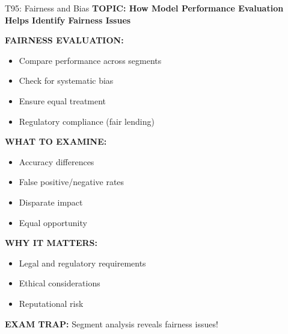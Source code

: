\documentclass[8pt]{beamer}
\begin{document}
	\begin{frame}{T95: Fairness and Bias}
		\fontsize{6.5}{7.5}\selectfont
		\textbf{TOPIC: How Model Performance Evaluation Helps Identify Fairness Issues}
		
		\vspace{0.1cm}
		\textbf{FAIRNESS EVALUATION:}
		\begin{itemize}
			\item Compare performance across segments
			\item Check for systematic bias
			\item Ensure equal treatment
			\item Regulatory compliance (fair lending)
		\end{itemize}
		
		\vspace{0.1cm}
		\textbf{WHAT TO EXAMINE:}
		\begin{itemize}
			\item Accuracy differences
			\item False positive/negative rates
			\item Disparate impact
			\item Equal opportunity
		\end{itemize}
		
		\vspace{0.1cm}
		\textbf{WHY IT MATTERS:}
		\begin{itemize}
			\item Legal and regulatory requirements
			\item Ethical considerations
			\item Reputational risk
		\end{itemize}
		
		\textcolor{myred}{\textbf{EXAM TRAP:}} Segment analysis reveals \textcolor{myblue}{fairness issues}!
	\end{frame}
	
\end{document}
